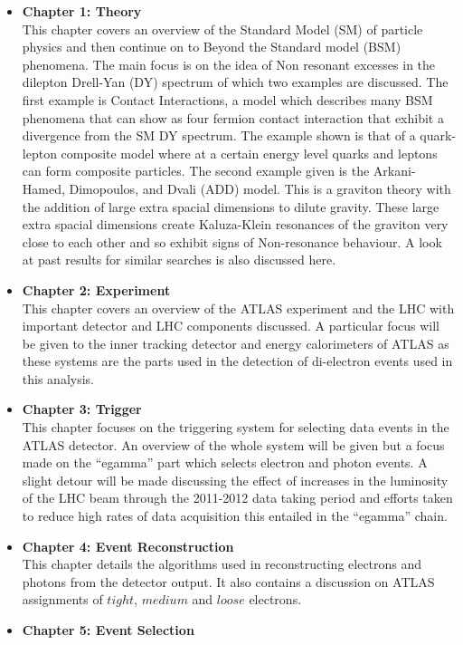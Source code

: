 \begin{itemize}
\item{ 
{\bf Chapter 1: Theory} \\
This chapter covers an overview of the Standard Model (SM) of particle physics and then continue on to Beyond the Standard model (BSM) phenomena. The main focus is on the idea of Non resonant excesses in the dilepton Drell-Yan (DY) spectrum of which two examples are discussed. The first example is Contact Interactions, a model which describes many BSM phenomena that can show as four fermion contact interaction that exhibit a divergence from the SM DY spectrum. The example shown is that of a quark-lepton composite model where at a certain energy level quarks and leptons can form composite particles. The second example given is the Arkani-Hamed, Dimopoulos, and Dvali (ADD) model. This is a graviton theory with the addition of large extra spacial dimensions to dilute gravity. These large extra spacial dimensions create Kaluza-Klein resonances of the graviton very close to each other and so exhibit signs of Non-resonance behaviour. A look at past results for similar searches is also discussed here.
}
\item{ 
{\bf Chapter 2: Experiment} \\
This chapter covers an overview of the ATLAS experiment and the LHC with important detector and LHC components discussed. A particular focus will be given to the inner tracking detector and energy calorimeters of ATLAS as these systems are the parts used in the detection of di-electron events used in this analysis.
}
\item{ 
{\bf Chapter 3: Trigger} \\
This chapter focuses on the triggering system for selecting data events in the ATLAS detector. An overview of the whole system will be given but a focus made on the ``egamma'' part which selects electron and photon events. A slight detour will be made discussing the effect of increases in the luminosity of the LHC beam through the 2011-2012 data taking period and efforts taken to reduce high rates of data acquisition this entailed in the ``egamma'' chain.
}
\item{ 
{\bf Chapter 4: Event Reconstruction} \\
This chapter details the algorithms used in reconstructing electrons and photons from the detector output. It also contains a discussion on ATLAS assignments of $tight$, $medium$ and $loose$ electrons.
}
\item{ 
{\bf Chapter 5: Event Selection} \\
}
\end{itemize}
